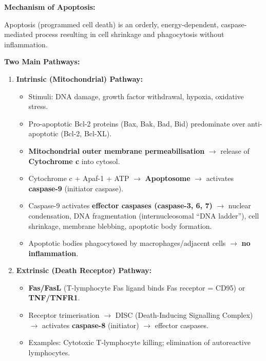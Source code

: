 \documentclass[11pt,a4paper]{article}
\begin{document}
\begin{ansbox}
\textbf{Mechanism of Apoptosis:}

Apoptosis (programmed cell death) is an orderly, energy-dependent, caspase-mediated process resulting in cell shrinkage and phagocytosis without inflammation.

\textbf{Two Main Pathways:}

\begin{enumerate}[leftmargin=*]
    \item \textbf{Intrinsic (Mitochondrial) Pathway:}
    \begin{itemize}
        \item Stimuli: DNA damage, growth factor withdrawal, hypoxia, oxidative stress.
        \item Pro-apoptotic Bcl-2 proteins (Bax, Bak, Bad, Bid) predominate over anti-apoptotic (Bcl-2, Bcl-XL).
        \item \textbf{Mitochondrial outer membrane permeabilisation} $\rightarrow$ release of \textbf{Cytochrome c} into cytosol.
        \item Cytochrome c + Apaf-1 + ATP $\rightarrow$ \textbf{Apoptosome} $\rightarrow$ activates \textbf{caspase-9} (initiator caspase).
        \item Caspase-9 activates \textbf{effector caspases (caspase-3, 6, 7)} $\rightarrow$ nuclear condensation, DNA fragmentation (internucleosomal ``DNA ladder''), cell shrinkage, membrane blebbing, apoptotic body formation.
        \item Apoptotic bodies phagocytosed by macrophages/adjacent cells $\rightarrow$ \textbf{no inflammation}.
    \end{itemize}
    \item \textbf{Extrinsic (Death Receptor) Pathway:}
    \begin{itemize}
        \item \textbf{Fas/FasL} (T-lymphocyte Fas ligand binds Fas receptor = CD95) or \textbf{TNF/TNFR1}.
        \item Receptor trimerisation $\rightarrow$ DISC (Death-Inducing Signalling Complex) $\rightarrow$ activates \textbf{caspase-8} (initiator) $\rightarrow$ effector caspases.
        \item Examples: Cytotoxic T-lymphocyte killing; elimination of autoreactive lymphocytes.
    \end{itemize}
\end{enumerate}


\end{ansbox}
\end{document}
